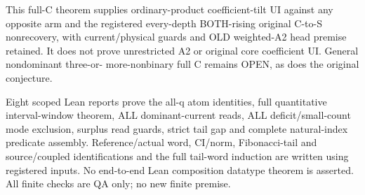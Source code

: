 This full-C theorem supplies ordinary-product coefficient-tilt UI
against any opposite arm and the registered every-depth BOTH-rising
original C-to-S nonrecovery, with current/physical guards and OLD
weighted-A2 head premise retained. It does not prove unrestricted
A2 or original core coefficient UI. General nondominant three-or-
more-nonbinary full C remains OPEN, as does the original conjecture.

Eight scoped Lean reports prove the all-q atom identities, full
quantitative interval-window theorem, ALL dominant-current reads,
ALL deficit/small-count mode exclusion, surplus read guards,
strict tail gap and complete natural-index predicate assembly.
Reference/actual word, CI/norm, Fibonacci-tail and source/coupled
identifications and the full tail-word induction are written using
registered inputs. No end-to-end Lean composition datatype theorem
is asserted. All finite checks are QA only; no new finite premise.
